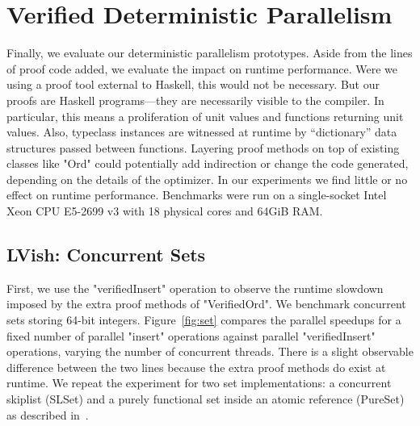 \section{Verified Deterministic Parallelism}\label{sec:eval-parallelism}


Finally, we evaluate our deterministic
parallelism prototypes.  Aside from the lines of proof code added,
we evaluate the impact on runtime performance.
%
Were we using a proof tool external to Haskell, this would not be necessary.
But our proofs are Haskell programs---they are necessarily visible to the
compiler.  In particular, this means a proliferation of unit values and functions
returning unit values.  Also, typeclass instances are witnessed at runtime by
``dictionary'' data structures passed between functions.  Layering proof methods
on top of existing classes like "Ord"
could potentially add indirection or change the
code generated, depending on the details of the optimizer.
%
%
In our experiments we find little or no effect on runtime performance.
Benchmarks were run on a single-socket Intel{\textregistered}
Xeon{\textregistered} CPU E5-2699 v3 with 18 physical cores and 64GiB RAM.

\subsection{LVish: Concurrent Sets}
\label{sec:set}

First, we use the "verifiedInsert" operation
to observe the runtime slowdown imposed by the extra proof methods
of "VerifiedOrd".
We benchmark concurrent sets storing 64-bit integers.
Figure~\ref{fig:set} compares the parallel speedups
for a fixed number of parallel "insert" operations
against parallel "verifiedInsert" operations, varying the number of concurrent
threads.
%
There is a slight observable difference between the two
lines because the extra proof methods do exist at runtime.
%
We repeat the experiment for two set implementations: a concurrent skiplist
(SLSet) and a purely functional set inside an atomic reference (PureSet)
as described in~\citet{kuper2014freeze}.

